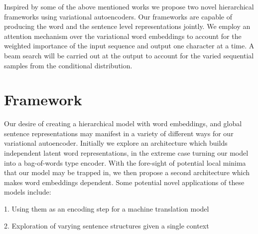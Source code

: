 \documentclass[journal, 12pt, draftcls, onecolumn]{IEEEtran}
\begin{document}
Inspired by some of the above mentioned works we propose two novel hierarchical frameworks using variational autoencoders. Our frameworks are capable of producing the word and the sentence level representations jointly. We employ an attention mechanism over the variational word embeddings to account for the weighted importance of the input sequence and output one character at a time. A beam search will be carried out at the output to account for the varied sequential samples from the conditional distribution.  

\section {Framework} \label{framework}
Our desire of creating a hierarchical model with word embeddings, and global sentence representations may manifest in a variety of different ways for our variational autoencoder. Initially we explore an architecture which builds independent latent word representations, in the extreme case turning our model into a bag-of-words type encoder. With the fore-sight of potential local minima that our model may be trapped in, we then propose a second architecture which makes word embeddings dependent. Some potential novel applications of these models include:

1. Using them as an encoding step for a machine translation model

2. Exploration of varying sentence structures given a single context
\end{document}
